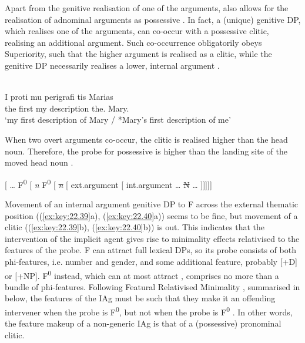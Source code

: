 \documentclass[output=paper]{langsci/langscibook}
\begin{document}
Apart from the genitive realisation of one of the arguments,  also allows
for the realisation of adnominal arguments as possessive . In fact, a
(unique) genitive DP, which realises one of the arguments, can co-occur with a
possessive clitic, realising an additional argument. Such co-occurrence
obligatorily obeys Superiority, such that the higher argument is realised as a
clitic, while the genitive DP necessarily realises a lower, internal argument
.

\ea%
    \label{ex:key:22.42}\\
    \gll    I  proti  mu  perigrafi  tis    Marias\\
            the  first  my   description  the.\Gen{}  Mary.\Gen{}\\
    \glt    \enquote*{my first description of Mary / *Mary’s first description of me}
\z

When two overt arguments co-occur, the clitic is realised higher than the head
noun. Therefore, the probe for possessive  is higher than the landing
site of the moved head noun .

\ea%
    \label{ex:key:22.43}
    {}[ \dots{} F\tss{\Poss\Cl{}}\textsuperscript{0}
        [ \emph{n} F\tss{\Gen{}}\textsuperscript{0}
            [ \sout{\emph{n}} [  ext.argument
                [ int.argument  \dots{}  \sout{N} \dots{} ]]]]]
\z

Movement of an internal argument genitive DP to F\tss{\Gen{}} across the
external thematic position ((\ref{ex:key:22.39}a), (\ref{ex:key:22.40}a)) seems
to be fine, but movement of a clitic ((\ref{ex:key:22.39}b),
(\ref{ex:key:22.40}b)) is out. This indicates that the intervention of the
implicit agent gives rise to minimality effects relativised to the features of
the probe. F\tss{\Gen{}} can attract full lexical DPs, so its probe consists of
both phi-features, i.e.  number and gender, and some additional feature,
probably [+D] or [+NP].  F\tss{\Poss\Cl{}}\textsuperscript{0} instead, which
can at most attract , comprises no more than a bundle of phi-features.
Following Featural Relativised Minimality
\parencite{Starke2001,Rizzi2001,Rizzi2013}, summarised in 
below, the features of the \gls{IAg} must be such that
they make it an offending intervener when the probe is
F\tss{\Poss\Cl{}}\textsuperscript{0}, but not when the probe is
F\tss{\Gen{}}\textsuperscript{0} . In other words, the
feature makeup of a non-generic \gls{IAg} is that of a
(possessive) pronominal clitic.
\end{document}
